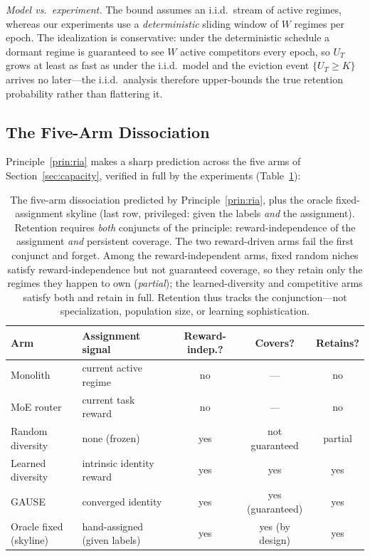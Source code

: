 \documentclass[10pt]{article}
\begin{document}
\noindent\emph{Model vs.\ experiment.} The bound assumes an i.i.d.\ stream of active
regimes, whereas our experiments use a \emph{deterministic} sliding window of $W$
regimes per epoch. The idealization is conservative: under the deterministic
schedule a dormant regime is guaranteed to see $W$ active competitors every epoch,
so $U_T$ grows at least as fast as under the i.i.d.\ model and the eviction event
$\{U_T\ge K\}$ arrives no later---the i.i.d.\ analysis therefore upper-bounds the
true retention probability rather than flattering it.

\subsection{The Five-Arm Dissociation}

Principle~\ref{prin:ria} makes a sharp prediction across the five arms of
Section~\ref{sec:capacity}, verified in full by the experiments
(Table~\ref{tab:fivearm}):

\begin{table}[h]
\centering
\small
\begin{tabular}{llccc}
\toprule
\textbf{Arm} & \textbf{Assignment signal} & \textbf{Reward-indep.?} &
\textbf{Covers?} & \textbf{Retains?} \\
\midrule
Monolith & current active regime & no & --- & no \\
MoE router & current task reward & no & --- & no \\
Random diversity & none (frozen) & yes & not guaranteed & partial \\
Learned diversity & intrinsic identity reward & yes & yes & yes \\
GAUSE & converged identity & yes & yes (guaranteed) & yes \\
\midrule
Oracle fixed (skyline) & hand-assigned (given labels) & yes & yes (by design) & yes \\
\bottomrule
\end{tabular}
\caption{The five-arm dissociation predicted by Principle~\ref{prin:ria}, plus
the oracle fixed-assignment skyline (last row, privileged: given the labels
\emph{and} the assignment).
Retention requires \emph{both} conjuncts of the principle: reward-independence of
the assignment \emph{and} persistent coverage. The two reward-driven arms fail the
first conjunct and forget. Among the reward-independent arms, fixed random niches
satisfy reward-independence but not guaranteed coverage, so they retain only the
regimes they happen to own (\emph{partial}); the learned-diversity and competitive
arms satisfy both and retain in full. Retention thus tracks the conjunction---not
specialization, population size, or learning sophistication.}
\label{tab:fivearm}
\end{table}
\end{document}
